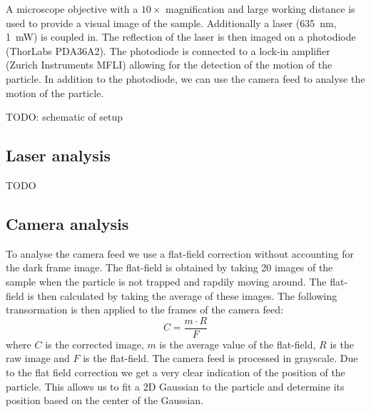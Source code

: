 A microscope objective with a $10\times$ magnification and large working distance is used to provide a visual image of the sample. Additionally a laser (\qty{635}{\nm}, \qty{1}{\milli\watt}) is coupled in. The reflection of the laser is then imaged on a photodiode (ThorLabs PDA36A2). The photodiode is connected to a lock-in amplifier (Zurich Instruments MFLI) allowing for the detection of the motion of the particle. In addition to the photodiode, we can use the camera feed to analyse the motion of the particle.

TODO: schematic of setup

\subsection{Laser analysis}
TODO

\subsection{Camera analysis}
To analyse the camera feed we use a flat-field correction without accounting for the dark frame image. The flat-field is obtained by taking 20 images of the sample when the particle is not trapped and rapdily moving around. The flat-field is then calculated by taking the average of these images. The following transormation is then applied to the frames of the camera feed:
\begin{equation}
    C = \frac{m \cdot R}{F}
    \tag{flat-field correction}
    \label{eq:flat-field-correction}
\end{equation}
where $C$ is the corrected image, $m$ is the average value of the flat-field, $R$ is the raw image and $F$ is the flat-field. The camera feed is processed in grayscale. Due to the flat field correction we get a very clear indication of the position of the particle. This allows us to fit a 2D Gaussian to the particle and determine its position based on the center of the Gaussian.
